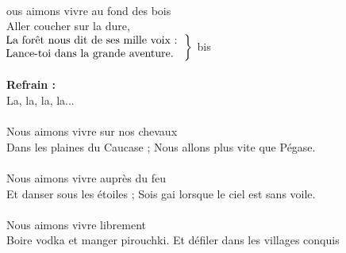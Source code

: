 
\\
{ous} aimons vivre au fond des bois
\\Aller coucher sur la dure,\\
$\left.\begin{tabular}{l}
\hspace{-0.4cm}
La forêt nous dit de ses mille voix :  
\\
\hspace{-0.4cm}
Lance-toi dans la grande aventure. 
\end{tabular}\right\rbrace$ bis
\\\\\textbf{Refrain :}
\\La, la, la, la... 
\\\\Nous aimons vivre sur nos chevaux
\\Dans les plaines du Caucase ;
{Nous allons plus vite que Pégase.}
\\\\Nous aimons vivre auprès du feu
\\Et danser sous les étoiles ;
{Sois gai lorsque le ciel est sans voile.}
\\\\Nous aimons vivre librement
\\Boire vodka et manger pirouchki.
{Et défiler dans les villages conquis}



\breakpage